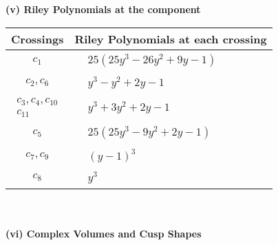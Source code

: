 \documentclass[1p]{elsarticle_modified}
\theoremstyle{definition}
\begin{document}
\newpage\renewcommand{\arraystretch}{1}
\flushleft \textbf{(v) Riley Polynomials at the component}\newline \\
\begin{tabular}{m{50pt}|m{274pt}}
Crossings & \hspace{64pt}Riley Polynomials at each crossing \\
\hline $$\begin{aligned}c_{1}\end{aligned}$$&$\begin{aligned}
&25(25 y^3-26 y^2+9 y-1)
\end{aligned}$\\
\hline $$\begin{aligned}c_{2},c_{6}\end{aligned}$$&$\begin{aligned}
&y^3- y^2+2 y-1
\end{aligned}$\\
\hline $$\begin{aligned}c_{3},c_{4},c_{10}\\c_{11}\end{aligned}$$&$\begin{aligned}
&y^3+3 y^2+2 y-1
\end{aligned}$\\
\hline $$\begin{aligned}c_{5}\end{aligned}$$&$\begin{aligned}
&25(25 y^3-9 y^2+2 y-1)
\end{aligned}$\\
\hline $$\begin{aligned}c_{7},c_{9}\end{aligned}$$&$\begin{aligned}
&(y-1)^3
\end{aligned}$\\
\hline $$\begin{aligned}c_{8}\end{aligned}$$&$\begin{aligned}
&y^3
\end{aligned}$\\
\hline
\end{tabular}\\~\\
\newpage\flushleft \textbf{(vi) Complex Volumes and Cusp Shapes}
\end{document}
